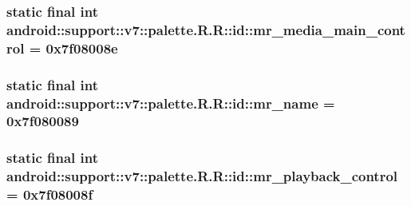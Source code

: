\hypertarget{classandroid_1_1support_1_1v7_1_1palette_1_1_r_1_1id_d1395f76f7110e4db4aecbadc8e39608}{
\subsubsection[{mr\_\-media\_\-main\_\-control}]{\setlength{\rightskip}{0pt plus 5cm}static final int android::support::v7::palette.R.R::id::mr\_\-media\_\-main\_\-control = 0x7f08008e}}
\label{classandroid_1_1support_1_1v7_1_1palette_1_1_r_1_1id_d1395f76f7110e4db4aecbadc8e39608}


\hypertarget{classandroid_1_1support_1_1v7_1_1palette_1_1_r_1_1id_956638cd231c0e4b0cb86d3990302cdd}{
\subsubsection[{mr\_\-name}]{\setlength{\rightskip}{0pt plus 5cm}static final int android::support::v7::palette.R.R::id::mr\_\-name = 0x7f080089}}
\label{classandroid_1_1support_1_1v7_1_1palette_1_1_r_1_1id_956638cd231c0e4b0cb86d3990302cdd}


\hypertarget{classandroid_1_1support_1_1v7_1_1palette_1_1_r_1_1id_3fbf64c92d959c71827e140ae489d89f}{
\subsubsection[{mr\_\-playback\_\-control}]{\setlength{\rightskip}{0pt plus 5cm}static final int android::support::v7::palette.R.R::id::mr\_\-playback\_\-control = 0x7f08008f}}
\label{classandroid_1_1support_1_1v7_1_1palette_1_1_r_1_1id_3fbf64c92d959c71827e140ae489d89f}


